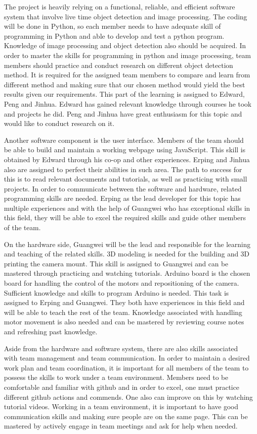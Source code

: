 \documentclass[12pt]{article}
\begin{document}
The project is heavily relying on a functional, reliable, and efficient software system that involve live time object detection and image processing. The coding will be done in Python, so each member needs to have adequate skill of programming in Python and able to develop and test a python program. Knowledge of image processing and object detection also should be acquired.  In order to master the skills for programming in python and image processing, team members should practice and conduct research on different object detection method. It is required for the assigned team members to compare and learn from different method and making sure that our chosen method would yield the best results given our requirements. This part of the learning is assigned to Edward, Peng and Jinhua. Edward has gained relevant knowledge through courses he took and projects he did. Peng and Jinhua have great enthusiasm for this topic and would like to conduct research on it. 

Another software component is the user interface. Members of the team should be able to build and maintain a working webpage using JavaScript. This skill is obtained by Edward through his co-op and other experiences. Erping and Jinhua also are assigned to perfect their abilities in such area. The path to success for this is to read relevant documents and tutorials, as well as practicing with small projects.
In order to communicate between the software and hardware, related programming skills are needed. Erping as the lead developer for this topic has multiple experiences and with the help of Guangwei who has exceptional skills in this field, they will be able to excel the required skills and guide other members of the team.  

On the hardware side, Guangwei will be the lead and responsible for the learning and teaching of the related skills. 3D modeling is needed for the building and 3D printing the camera mount. This skill is assigned to Guangwei and can be mastered through practicing and watching tutorials. Arduino board is the chosen board for handling the control of the motors and repositioning of the camera. Sufficient knowledge and skills to program Arduino is needed. This task is assigned to Erping and Guangwei. They both have experiences in this field and will be able to teach the rest of the team. Knowledge associated with handling motor movement is also needed and can be mastered by reviewing course notes and refreshing past knowledge. 

Aside from the hardware and software system, there are also skills associated with team management and team communication. In order to maintain a desired work plan and team coordination, it is important for all members of the team to possess the skills to work under a team environment. Members need to be comfortable and familiar with github and in order to excel, one must practice different github actions and commends. One also can improve on this by watching tutorial videos. Working in a team environment, it is important to have good communication skills and making sure people are on the same page. This can be mastered by actively engage in team meetings and ask for help when needed.  
\end{document}
